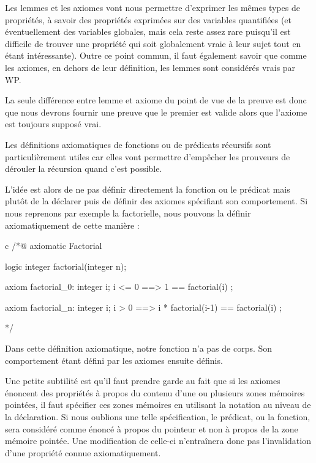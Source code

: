 

Les lemmes et les axiomes vont nous permettre d'exprimer les mêmes types de 
propriétés, à savoir des propriétés exprimées sur des variables quantifiées (et
éventuellement des variables globales, mais cela reste assez rare puisqu'il est
difficile de trouver une propriété qui soit globalement vraie à leur sujet tout
en étant intéressante). Outre ce point commun, il faut également savoir que 
comme les axiomes, en dehors de leur définition, les lemmes sont considérés 
vrais par WP.



La seule différence entre lemme et axiome du point de vue de la preuve est donc
que nous devrons fournir une preuve que le premier est valide alors que l'axiome
est toujours supposé vrai.





Les définitions axiomatiques de fonctions ou de prédicats récursifs sont 
particulièrement utiles car elles vont permettre d'empêcher les prouveurs de 
dérouler la récursion quand c'est possible.



L'idée est alors de ne pas définir directement la fonction ou le prédicat mais 
plutôt de la déclarer puis de définir des axiomes spécifiant son comportement.
Si nous reprenons par exemple la factorielle, nous pouvons la définir 
axiomatiquement de cette manière :



\begin{CodeBlock}{c}
/*@
  axiomatic Factorial{
    logic integer factorial(integer n);
    
    axiom factorial_0:
      \forall integer i; i <= 0 ==> 1 == factorial(i) ;

    axiom factorial_n:
      \forall integer i; i > 0 ==> i * factorial(i-1) == factorial(i) ;
  }
*/
\end{CodeBlock}



Dans cette définition axiomatique, notre fonction n'a pas de corps. Son 
comportement étant défini par les axiomes ensuite définis.



Une petite subtilité
est qu'il faut prendre garde au fait que si les axiomes énoncent des propriétés
à propos du contenu d'une ou plusieurs zones mémoires pointées, il faut 
spécifier ces zones mémoires en utilisant la notation  au niveau de
la déclaration. Si nous oublions une telle spécification, le prédicat, ou la 
fonction, sera considéré comme énoncé à propos du pointeur et non à propos de la
zone mémoire pointée. Une modification de celle-ci n'entraînera donc pas 
l'invalidation d'une propriété connue axiomatiquement.



